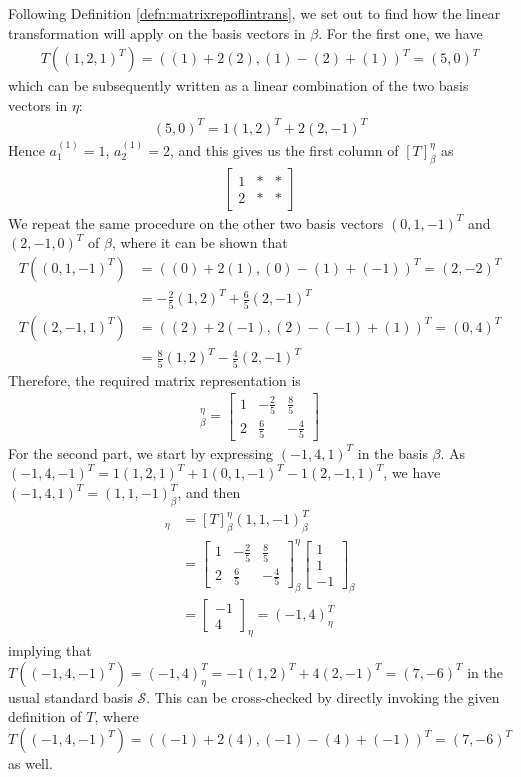 \begin{solution}
Following Definition \ref{defn:matrixrepoflintrans}, we set out to find how the linear transformation will apply on the basis vectors in $\mathcal{\beta}$. For the first one, we have
\begin{align*}
T((1,2,1)^T) = ((1)+2(2), (1)-(2)+(1))^T = (5,0)^T
\end{align*}
which can be subsequently written as a linear combination of the two basis vectors in $\mathcal{\eta}$:
\begin{align*}
(5,0)^T = 1(1,2)^T + 2(2,-1)^T
\end{align*}
Hence $a_1^{(1)} = 1$, $a_2^{(1)} = 2$, and this gives us the first column of $[T]_\beta^\eta$ as
\begin{align*}
\begin{bmatrix}
1 & * & * \\
2 & * & * 
\end{bmatrix}
\end{align*}
We repeat the same procedure on the other two basis vectors $(0,1,-1)^T$ and $(2,-1,0)^T$ of $\mathcal{\beta}$, where it can be shown that
\begin{align*}
T((0,1,-1)^T) &= ((0)+2(1), (0)-(1)+(-1))^T = (2,-2)^T \\
&= -\frac{2}{5}(1,2)^T + \frac{6}{5}(2,-1)^T \\
T((2,-1,1)^T) &= ((2)+2(-1), (2)-(-1)+(1))^T = (0,4)^T \\
&= \frac{8}{5}(1,2)^T - \frac{4}{5}(2,-1)^T
\end{align*}
Therefore, the required matrix representation is
\begin{align*}
[T]_\beta^\eta = 
\begin{bmatrix}
1 & -\frac{2}{5} & \frac{8}{5} \\
2 & \frac{6}{5} & -\frac{4}{5}
\end{bmatrix}
\end{align*}
For the second part, we start by expressing $(-1,4,1)^T$ in the basis $\mathcal{\beta}$. As $(-1,4,-1)^T = 1(1,2,1)^T + 1(0,1,-1)^T - 1(2,-1,1)^T$, we have $(-1,4,1)^T = (1,1,-1)_\beta^T$, and then
\begin{align*}
[T((1,1,-1)_\beta^T)]_\eta &= [T]_\beta^\eta (1,1,-1)_\beta^T \\
&=
\begin{bmatrix}
1 & -\frac{2}{5} & \frac{8}{5} \\
2 & \frac{6}{5} & -\frac{4}{5}
\end{bmatrix}_\beta^\eta
\begin{bmatrix}
1 \\
1 \\
-1
\end{bmatrix}_\beta \\
&=
\begin{bmatrix}
-1 \\
4
\end{bmatrix}_\eta = (-1,4)^T_\eta
\end{align*}
implying that $T((-1,4,-1)^T) = (-1,4)_\eta^T = -1(1,2)^T + 4(2,-1)^T = (7,-6)^T$ in the usual standard basis $\mathcal{S}$. This can be cross-checked by directly invoking the given definition of $T$, where $T((-1,4,-1)^T) = ((-1)+2(4), (-1)-(4)+(-1))^T = (7,-6)^T$ as well.
\end{solution}
